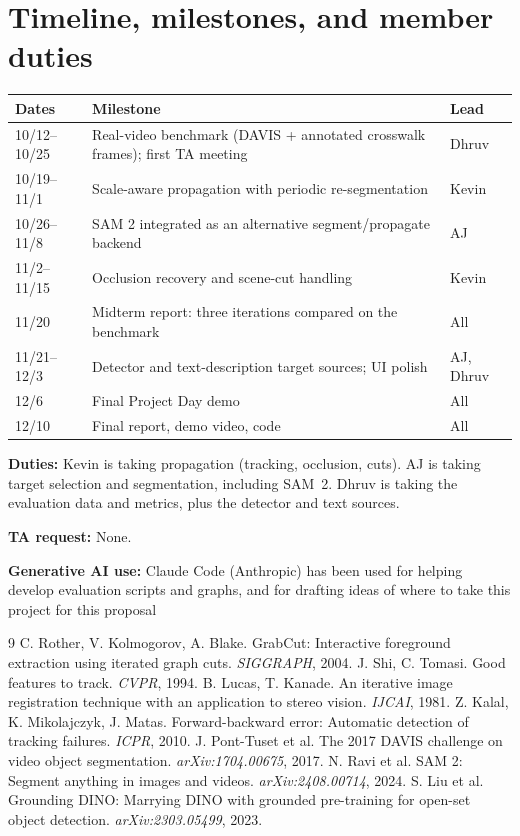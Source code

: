 \documentclass[10pt,letterpaper]{article}
\begin{document}
\section{Timeline, milestones, and member duties}

\begin{center}
\small
\begin{tabular}{lll}
\toprule
Dates & Milestone & Lead \\
\midrule
10/12--10/25 & Real-video benchmark (DAVIS + annotated crosswalk frames); first TA meeting & Dhruv \\
10/19--11/1  & Scale-aware propagation with periodic re-segmentation & Kevin \\
10/26--11/8  & SAM 2 integrated as an alternative segment/propagate backend & AJ \\
11/2--11/15  & Occlusion recovery and scene-cut handling & Kevin \\
11/20        & Midterm report: three iterations compared on the benchmark & All \\
11/21--12/3  & Detector and text-description target sources; UI polish & AJ, Dhruv \\
12/6         & Final Project Day demo & All \\
12/10        & Final report, demo video, code & All \\
\bottomrule
\end{tabular}
\end{center}

\textbf{Duties:} Kevin is taking propagation (tracking, occlusion, cuts). AJ is taking target
selection and segmentation, including SAM~2. Dhruv is taking the evaluation data and metrics, plus
the detector and text sources.

\textbf{TA request:} None.

\textbf{Generative AI use:} Claude Code (Anthropic) has been used for helping develop evaluation scripts and graphs, and for drafting ideas of where to take this project for this proposal

{\footnotesize
\begin{thebibliography}{9}
\setlength{\itemsep}{0pt}
 C. Rother, V. Kolmogorov, A. Blake. GrabCut: Interactive foreground extraction
using iterated graph cuts. \emph{SIGGRAPH}, 2004.
 J. Shi, C. Tomasi. Good features to track. \emph{CVPR}, 1994.
 B. Lucas, T. Kanade. An iterative image registration technique with an application to
stereo vision. \emph{IJCAI}, 1981.
 Z. Kalal, K. Mikolajczyk, J. Matas. Forward-backward error: Automatic detection of
tracking failures. \emph{ICPR}, 2010.
 J. Pont-Tuset et al. The 2017 DAVIS challenge on video object segmentation.
\emph{arXiv:1704.00675}, 2017.
 N. Ravi et al. SAM 2: Segment anything in images and videos.
\emph{arXiv:2408.00714}, 2024.
 S. Liu et al. Grounding DINO: Marrying DINO with grounded pre-training for open-set
object detection. \emph{arXiv:2303.05499}, 2023.
\end{thebibliography}
}
\end{document}
